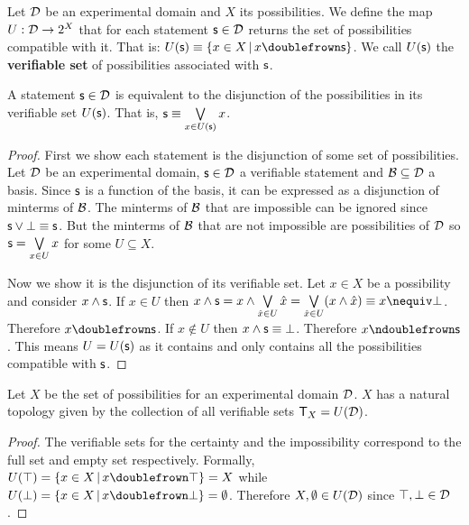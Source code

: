 	\begin{mathSection}
		
		\begin{defn}
			Let $\mathcal{D}$ be an experimental domain and $X$ its possibilities. We define the map $U : \mathcal{D} \rightarrow 2^X$ that for each statement $\mathsf{s} \in \mathcal{D}$ returns the set of possibilities compatible with it. That is: $U(\stmt)\equiv\{ x \in X \, | \, x \comp \stmt\}$. We call $U(\mathsf{s})$ the \textbf{verifiable set} of possibilities associated with $\mathsf{s}$.
		\end{defn}
		
		\begin{prop}
			A statement $\mathsf{s} \in \mathcal{D}$ is equivalent to the disjunction of the possibilities in its verifiable set $U(\mathsf{s})$. That is, $\mathsf{s} \equiv \bigvee\limits_{x \in U(\mathsf{s})} x$.
		\end{prop}
		\begin{proof}
			First we show each statement is the disjunction of some set of possibilities. Let $\mathcal{D}$ be an experimental domain, $\mathsf{s} \in \mathcal{D}$ a verifiable statement and $\mathcal{B} \subseteq \mathcal{D}$ a basis. Since $\mathsf{s}$ is a function of the basis, it can be expressed as a disjunction of minterms of $\mathcal{B}$. The minterms of $\mathcal{B}$ that are impossible can be ignored since $\mathsf{s} \vee \bot \equiv \mathsf{s}$. But the minterms of $\mathcal{B}$ that are not impossible are possibilities of $\mathcal{D}$ so $\mathsf{s}=\bigvee\limits_{x \in U} x$ for some $U \subseteq X$.
			
			Now we show it is the disjunction of its verifiable set. Let $x \in X$ be a possibility and consider $x \wedge \mathsf{s}$. If $x\in U$ then $x \AND \stmt = x \AND \bigOR\limits_{\hat{x} \in U} \hat{x} = \bigOR\limits_{\hat{x} \in U} ( x \AND \hat{x}) \equiv x \nequiv \impossibility$. Therefore $x \comp \stmt$. If $x \notin U$ then $x \wedge \mathsf{s} \equiv \bot$. Therefore $x \ncomp \stmt$. This means $U=U(\mathsf{s})$ as it contains and only contains all the possibilities compatible with $\mathsf{s}$.
		\end{proof}
		
		\begin{prop}
			Let $X$ be the set of possibilities for an experimental domain $\mathcal{D}$. $X$ has a natural topology given by the collection of all verifiable sets $\mathsf{T}_X=U(\mathcal{D})$.
		\end{prop}
		
		\begin{proof}
			The verifiable sets for the certainty and the impossibility correspond to the full set and empty set respectively. Formally, $U(\certainty) = \{ x \in X \, | \, x \comp \certainty\} = X$ while $U(\impossibility) = \{ x \in X \, | \, x \comp \impossibility\} = \emptyset$. Therefore $X, \emptyset \in U(\mathcal{D})$ since $\top, \bot \in \mathcal{D}$.
			

\end{proof}
\end{mathSection}

